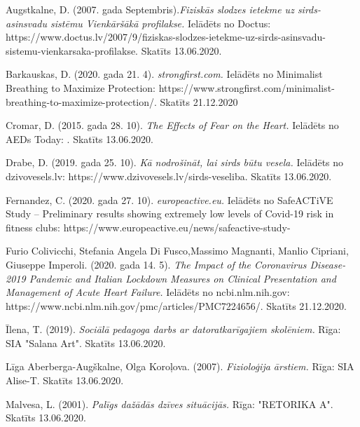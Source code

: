 \documentclass[12pt]{article}
\begin{document}
\begingroup
\renewcommand{\section}[2]{}
\begin{thebibliography}{9}
Augstkalne, D. (2007. gada Septembris).\textit{Fiziskās slodzes ietekme uz sirds-asinsvadu sistēmu Vienkāršākā profilakse.} Ielādēts no Doctus: https://www.doctus.lv/2007/9/fiziskas-slodzes-ietekme-uz-sirds-asinsvadu-sistemu-vienkarsaka-profilakse. Skatīts 13.06.2020. 

Barkauskas, D. (2020. gada 21. 4). \textit{strongfirst.com.} Ielādēts no Minimalist Breathing to Maximize Protection: https://www.strongfirst.com/minimalist-breathing-to-maximize-protection/. Skatīts 21.12.2020

Cromar, D. (2015. gada 28. 10). \textit{The Effects of Fear on the Heart.} Ielādēts no AEDs Today: . Skatīts 13.06.2020.

Drabe, D. (2019. gada 25. 10). \textit{Kā nodrošināt, lai sirds būtu vesela.} Ielādēts no dzivovesels.lv: https://www.dzivovesels.lv/sirds-veseliba. Skatīts 13.06.2020.

Fernandez, C. (2020. gada 27. 10). \textit{europeactive.eu.} Ielādēts no SafeACTiVE Study – Preliminary results showing extremely low levels of Covid-19 risk in fitness clubs: https://www.europeactive.eu/news/safeactive-study-%

Furio Colivicchi, Stefania Angela Di Fusco,Massimo Magnanti, Manlio Cipriani, Giuseppe Imperoli. (2020. gada 14. 5). \textit{The Impact of the Coronavirus Disease-2019 Pandemic and Italian Lockdown Measures on Clinical Presentation and Management of Acute Heart Failure.} Ielādēts no ncbi.nlm.nih.gov: https://www.ncbi.nlm.nih.gov/pmc/articles/PMC7224656/. Skatīts 21.12.2020.

Īlena, T. (2019). \textit{Sociālā pedagoga darbs ar datoratkarīgajiem skolēniem.} Rīga: SIA "Salana Art". Skatīts 13.06.2020.

Līga Aberberga-Augškalne, Olga Koroļova. (2007). \textit{Fizioloģija ārstiem.} Rīga: SIA Alise-T. Skatīts 13.06.2020.

Malvesa, L. (2001). \textit{Palīgs dažādās dzīves situācijās.} Rīga: "RETORIKA A". Skatīts 13.06.2020.


\end{thebibliography}
\end{document}
